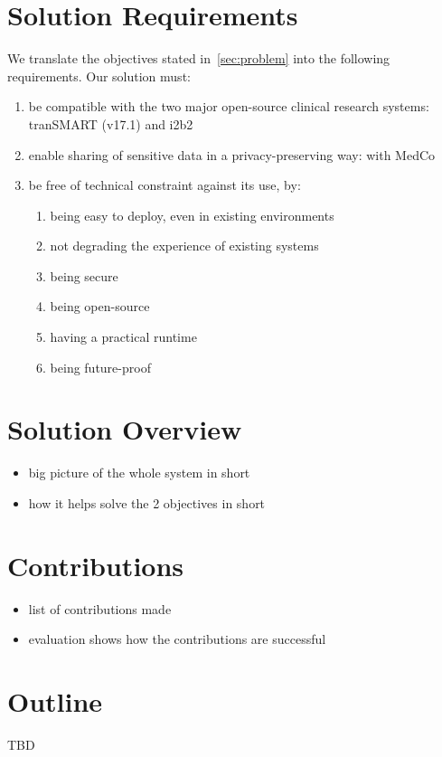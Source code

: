 \section{Solution Requirements}
\label{sec:requirements}

We translate the objectives stated in~\ref{sec:problem} into the following requirements.
Our solution must:

\begin{enumerate}
    \item be compatible with the two major open-source clinical research systems: tranSMART (v17.1) and i2b2  %
    \item enable sharing of sensitive data in a privacy-preserving way: with MedCo
    \item be free of technical constraint against its use, by:
    \begin{enumerate}
        \item being easy to deploy, even in existing environments
        \item not degrading the experience of existing systems
        \item being secure
        \item being open-source
        \item having a practical runtime
        \item being future-proof
    \end{enumerate}
\end{enumerate}




\section{Solution Overview}

\begin{itemize}
    \item big picture of the whole system in short
    \item how it helps solve the 2 objectives in short
\end{itemize}


\section{Contributions}

\begin{itemize}
    \item list of contributions made
    \item evaluation shows how the contributions are successful
\end{itemize}


\section{Outline}
TBD
